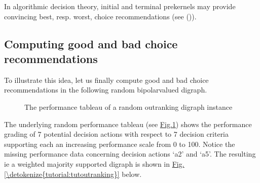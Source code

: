 \documentclass[a4paper,10pt,english]{sphinxhowto}
\let\sphinxpxdimen\pdfpxdimen\else\newdimen\sphinxpxdimen
\begin{document}
In algorithmic decision theory, initial and terminal prekernels may provide convincing best, resp. worst, choice recommendations (see {\hyperref[\detokenize{tutorial:rubis-tutorial-label}]{}} ()).


\subsection{Computing good and bad choice recommendations}
\label{\detokenize{tutorial:computing-good-and-bad-choice-recommendations}}
To illustrate this idea, let us finally compute good and bad choice recommendations in the following random bipolar\sphinxhyphen{}valued  digraph.

\begin{sphinxVerbatim}[commandchars=\\\{\},numbers=left,firstnumber=1,stepnumber=1]
   
  
\end{sphinxVerbatim}

\begin{figure}[htbp]
\centering
\capstart

\noindent\sphinxincludegraphics[width=550\sphinxpxdimen]{{randomOutranking}.png}
\caption{The performance tableau of a random outranking digraph instance}\label{\detokenize{tutorial:randomoutranking}}\end{figure}

The underlying random performance tableau (see \hyperref[\detokenize{tutorial:randomoutranking}]{Fig.\@ \ref{\detokenize{tutorial:randomoutranking}}}) shows the performance grading of 7 potential decision actions with respect to 7 decision criteria supporting each an increasing performance scale from 0 to 100. Notice the missing performance data concerning decision actions ‘a2’ and ‘a5’. The resulting  \sphinxhyphen{} ie a weighted majority supported \sphinxhyphen{}  \sphinxhyphen{} digraph is shown in \hyperref[\detokenize{tutorial:tutoutranking}]{Fig.\@ \ref{\detokenize{tutorial:tutoutranking}}} below.
\end{document}
